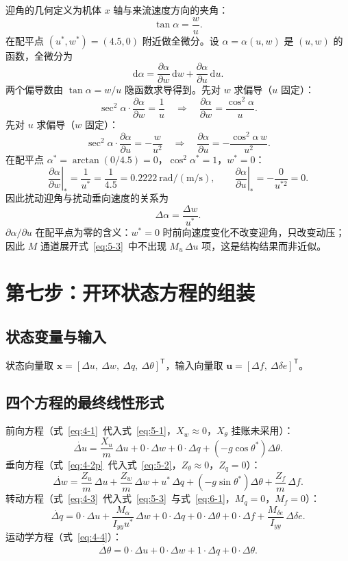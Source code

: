 \documentclass[11pt,a4paper]{ctexart}
\newcommand{\ud}[1]{\dot{#1}}
\newcommand{\bvec}[1]{\boldsymbol{#1}}
\newcommand{\dd}{\mathrm{d}}
\begin{document}
迎角的几何定义为机体 $x$ 轴与来流速度方向的夹角：
\[
\tan\alpha = \frac{w}{u}.
\]
在配平点 $(u^{*},w^{*})=(4.5,0)$ 附近做全微分。设 $\alpha=\alpha(u,w)$ 是 $(u,w)$ 的函数，全微分为
\[
\dd\alpha = \frac{\partial\alpha}{\partial w}\,\dd w + \frac{\partial\alpha}{\partial u}\,\dd u.
\]
两个偏导数由 $\tan\alpha=w/u$ 隐函数求导得到。先对 $w$ 求偏导（$u$ 固定）：
\[
\sec^2\alpha\cdot\frac{\partial\alpha}{\partial w} = \frac{1}{u}
\quad\Longrightarrow\quad
\frac{\partial\alpha}{\partial w} = \frac{\cos^2\alpha}{u}.
\]
先对 $u$ 求偏导（$w$ 固定）：
\[
\sec^2\alpha\cdot\frac{\partial\alpha}{\partial u} = -\frac{w}{u^2}
\quad\Longrightarrow\quad
\frac{\partial\alpha}{\partial u} = -\frac{\cos^2\alpha\,w}{u^2}.
\]
在配平点 $\alpha^{*}=\arctan(0/4.5)=0$，$\cos^2\alpha^{*}=1$，$w^{*}=0$：
\[
\left.\frac{\partial\alpha}{\partial w}\right|_{*} = \frac{1}{u^{*}} = \frac{1}{4.5} = 0.2222\ \mathrm{rad/(m/s)},
\qquad
\left.\frac{\partial\alpha}{\partial u}\right|_{*} = -\frac{0}{u^{*2}} = 0.
\]
因此扰动迎角与扰动垂向速度的关系为
\begin{equation}\label{eq:6-1}
\Delta\alpha = \frac{\Delta w}{u^{*}}.
\tag{(6-1)}
\end{equation}
$\partial\alpha/\partial u$ 在配平点为零的含义：$w^{*}=0$ 时前向速度变化不改变迎角，只改变动压；因此 $M$ 通道展开式~\eqref{eq:5-3}~中不出现 $M_u\,\Delta u$ 项，这是结构结果而非近似。

\section{第七步：开环状态方程的组装}\label{sec:assemble}

\subsection{状态变量与输入}

状态向量取 $\bvec{x}=[\Delta u,\ \Delta w,\ \Delta q,\ \Delta\theta]^{\mathsf T}$，输入向量取 $\bvec{u}=[\Delta f,\ \Delta\delta e]^{\mathsf T}$。

\subsection{四个方程的最终线性形式}

前向方程（式~\eqref{eq:4-1}~代入式~\eqref{eq:5-1}，$X_w\approx 0$，$X_\theta$ 挂账未采用）：
\[
\ud{\Delta u} = \frac{X_u}{m}\,\Delta u + 0\cdot\Delta w + 0\cdot\Delta q + \left(-g\cos\theta^{*}\right)\Delta\theta.
\]
垂向方程（式~\eqref{eq:4-2p}~代入式~\eqref{eq:5-2}，$Z_\theta\approx 0$，$Z_q=0$）：
\[
\ud{\Delta w} = \frac{Z_u}{m}\,\Delta u + \frac{Z_w}{m}\,\Delta w + u^{*}\,\Delta q + \left(-g\sin\theta^{*}\right)\Delta\theta + \frac{Z_f}{m}\,\Delta f.
\]
转动方程（式~\eqref{eq:4-3}~代入式~\eqref{eq:5-3}~与式~\eqref{eq:6-1}，$M_q=0$，$M_f=0$）：
\[
\ud{\Delta q} = 0\cdot\Delta u + \frac{M_\alpha}{I_{yy}u^{*}}\,\Delta w + 0\cdot\Delta q + 0\cdot\Delta\theta + 0\cdot\Delta f + \frac{M_{\delta e}}{I_{yy}}\,\Delta\delta e.
\]
运动学方程（式~\eqref{eq:4-4}）：
\[
\ud{\Delta\theta} = 0\cdot\Delta u + 0\cdot\Delta w + 1\cdot\Delta q + 0\cdot\Delta\theta.
\]
\end{document}

